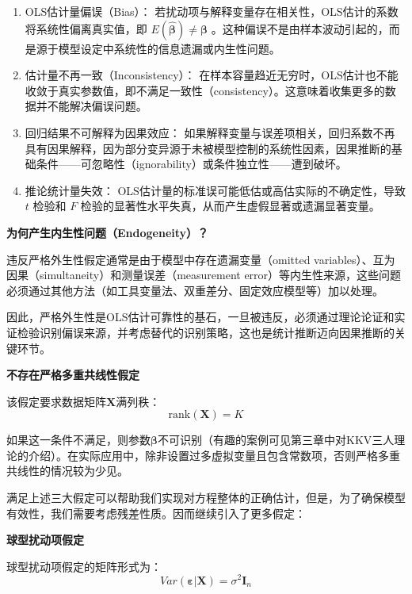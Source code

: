 \begin{enumerate}
\item OLS估计量偏误（Bias）：
若扰动项与解释变量存在相关性，OLS估计的系数将系统性偏离真实值，即 $E(\hat{\boldsymbol{\beta}}) \neq \boldsymbol{\beta}$ 。这种偏误不是由样本波动引起的，而是源于模型设定中系统性的信息遗漏或内生性问题。

\item 估计量不再一致（Inconsistency）：
在样本容量趋近无穷时，OLS估计也不能收敛于真实参数值，即不满足一致性（consistency）。这意味着收集更多的数据并不能解决偏误问题。

\item 回归结果不可解释为因果效应：
如果解释变量与误差项相关，回归系数不再具有因果解释，因为部分变异源于未被模型控制的系统性因素，因果推断的基础条件——可忽略性（ignorability）或条件独立性——遭到破坏。

\item 推论统计量失效：
OLS估计量的标准误可能低估或高估实际的不确定性，导致 $t$ 检验和 $F$ 检验的显著性水平失真，从而产生虚假显著或遗漏显著变量。
\end{enumerate}

\textbf{为何产生内生性问题（Endogeneity）？}

违反严格外生性假定通常是由于模型中存在遗漏变量（omitted variables）、互为因果（simultaneity）和测量误差（measurement error）等内生性来源，这些问题必须通过其他方法（如工具变量法、双重差分、固定效应模型等）加以处理。


因此，严格外生性是OLS估计可靠性的基石，一旦被违反，必须通过理论论证和实证检验识别偏误来源，并考虑替代的识别策略，这也是统计推断迈向因果推断的关键环节。

\textbf{不存在严格多重共线性假定}

该假定要求数据矩阵$\mathbf{X}$满列秩：
\begin{equation}
	\text{rank}(\mathbf{X}) = K
\end{equation}

如果这一条件不满足，则参数$\boldsymbol{\beta}$不可识别（有趣的案例可见第三章中对KKV三人理论的介绍）。在实际应用中，除非设置过多虚拟变量且包含常数项，否则严格多重共线性的情况较为少见。

满足上述三大假定可以帮助我们实现对方程整体的正确估计，但是，为了确保模型有效性，我们需要考虑残差性质。因而继续引入了更多假定：

\textbf{球型扰动项假定}

球型扰动项假定的矩阵形式为：
\begin{equation}
	Var(\boldsymbol{\varepsilon} | \mathbf{X}) = \sigma^2 \mathbf{I}_n
\end{equation}

